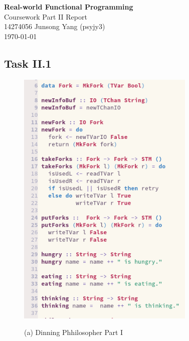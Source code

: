 \documentclass{article}
\begin{document}
\begin{center}
  \LARGE{\textbf{Real-world Functional Programming}} \\
  \Large{Coursework Part II Report} \\
  \normalsize{14274056 Junsong Yang (psyjy3)} \\
  \today
\end{center}


\begin{normalsize}
  \section{Task II.1}

  \begin{figure}[H]

    \begin{minipage}[b]{0.48\linewidth}
      \centering
      \centerline{\includegraphics[width=8.5cm]{dinning1}}
      \centerline{ (a) Dinning Phhilosopher Part I}\medskip
    \end{minipage}
    \hfill
    \begin{minipage}[b]{0.48\linewidth}
      \centering

\end{minipage}
\end{figure}
\end{normalsize}
\end{document}

